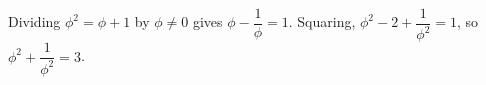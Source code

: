 Dividing $\phi^2=\phi+1$ by $\phi\ne0$ gives $\phi-\dfrac1\phi=1$. Squaring, $\phi^2-2+\dfrac1{\phi^2}=1$, so $\phi^2+\dfrac1{\phi^2}=\boxed{3}$.
